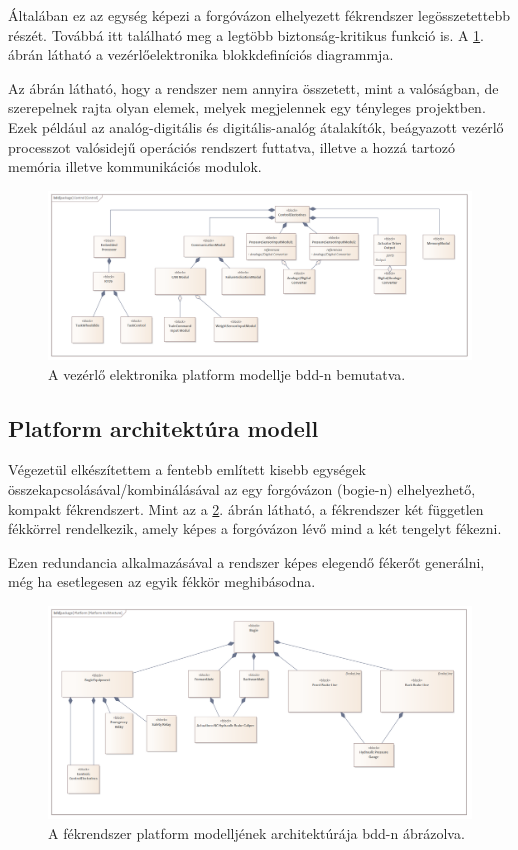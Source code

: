 Általában ez az egység képezi a forgóvázon elhelyezett fékrendszer legösszetettebb részét.
Továbbá itt található meg a legtöbb biztonság-kritikus funkció is.
A \ref{fig:control_elect}. ábrán látható a vezérlőelektronika blokkdefiníciós diagrammja.

Az ábrán látható, hogy a rendszer nem annyira összetett, mint a valóságban, de szerepelnek rajta olyan elemek, melyek megjelennek egy tényleges projektben.
Ezek például az analóg-digitális és digitális-analóg átalakítók, beágyazott vezérlő processzot valósidejű operációs rendszert futtatva, illetve a hozzá tartozó memória illetve kommunikációs modulok.

\begin{figure}
    \footnotesize
    \centering
    \includegraphics[width=150mm, keepaspectratio]{figures/Platform_Control_bdd.png}
    \caption{A vezérlő elektronika platform modellje bdd-n bemutatva.}
    \label{fig:control_elect}
\end{figure}

\subsection{Platform architektúra modell}
Végezetül elkészítettem a fentebb említett kisebb egységek összekapcsolásával/kombinálásával az egy forgóvázon (bogie-n) elhelyezhető, kompakt fékrendszert.
Mint az a \ref{fig:plat_arch}. ábrán látható, a fékrendszer két független fékkörrel rendelkezik, amely képes a forgóvázon lévő mind a két tengelyt fékezni.

Ezen redundancia alkalmazásával a rendszer képes elegendő fékerőt generálni, még ha esetlegesen az egyik fékkör meghibásodna.

\begin{figure}
    \footnotesize
    \centering
    \includegraphics[width=150mm, keepaspectratio]{figures/Platform_Architecture_bdd.png}
    \caption{A fékrendszer platform modelljének architektúrája bdd-n ábrázolva.}
    \label{fig:plat_arch}
\end{figure}

